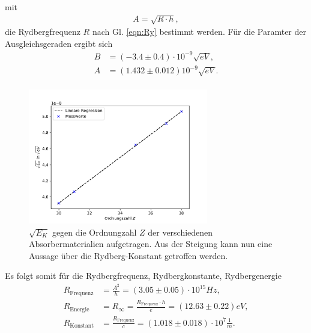 mit
\begin{align}
    A=\sqrt{R\cdot h},
    \label{eqn:Ry}
\end{align}
die Rydbergfrequenz $R$ nach Gl. \ref{eqn:Ry} bestimmt werden.
Für die Paramter der Ausgleichsgeraden ergibt sich
\begin{align*}
    B&=(-3.4\pm 0.4)\cdot 10^{-9}\sqrt{\si{eV}},\\
    A&=(1.432\pm 0.012) 10^{-9}\sqrt{\si{eV}}.\\
\end{align*}
\begin{figure}[H]
    \centering
    \includegraphics[width=0.7\textwidth]{plots/Moseley.pdf}
    \caption{$\sqrt{E_K}$ gegen die Ordnungzahl $Z$ der verschiedenen Absorbermaterialien
    aufgetragen. Aus der Steigung kann nun eine Aussage über die Rydberg-Konstant getroffen werden.}
\end{figure}
Es folgt somit für die Rydbergfrequenz, Rydbergkonstante, Rydbergenergie
\begin{align*}
    R_{\text{Frequenz}}&=\frac{A^2}{h}=(3.05\pm 0.05)\cdot 10^{15}\si{Hz},\\
    R_{\text{Energie}}&=R_{\infty}=\frac{R_{\text{Frequenz}}\cdot h}{e}=(12.63\pm 0.22)\si{eV},\\
    R_{\text{Konstant}}&=\frac{R_{\text{Frequenz}}}{c}=(1.018\pm 0.018)\cdot 10^7\frac{1}{m}.
\end{align*}

\label{sec:Auswertung}
